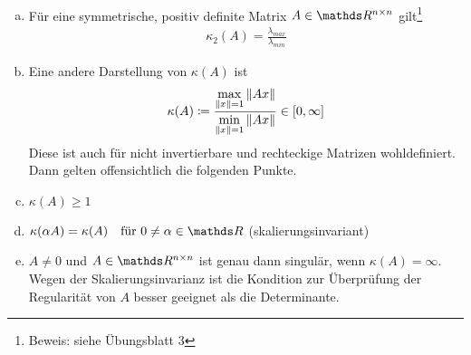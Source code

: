 \begin{Beme}
  \label{3.2.13}~
  \begin{enumerate}[a)]
  \item Für eine symmetrische, positiv definite Matrix $A\in \Renn$ gilt\footnote{Beweis: siehe Übungsblatt 3}
    \begin{gather}
      \kappa_2(A) = \frac{\lambda_{max}}{\lambda_{min}} \label{III.2.13}
    \end{gather}
  \item Eine andere Darstellung von $\kappa(A)$ ist
    \begin{gather}
      \kappa(A) \coloneqq 
      \frac{\underset{\nn[x]=1}{\max}\nn[Ax]}
      {\underset{\nn[x]=1}{\min}\nn[Ax]} 
      \in  \left[ 0, \infty \right]
      \label{III.2.14}
    \end{gather}
    Diese ist auch für nicht invertierbare und rechteckige Matrizen wohldefiniert.
    Dann gelten offensichtlich die folgenden Punkte.
  \item $\kappa(A) \geq 1$
  \item $\kappa(\alpha A)=\kappa(A) 
    \quad \text{für } 0\neq\alpha\in\R$ (skalierungsinvariant)
  \item $A\neq 0$ und $A\in\Renn $ ist genau dann singulär, 
    wenn $\kappa(A)=\infty$.
    Wegen der Skalierungsinvarianz ist die Kondition 
    zur Überprüfung der Regularität von $A$ 
    besser geeignet als die Determinante.
  \end{enumerate}
\end{Beme}


